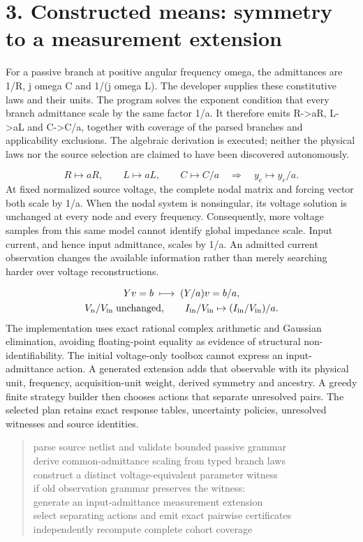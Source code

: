 \documentclass[10pt,letterpaper]{article}
\begin{document}
\section*{\color{accent}3. Constructed means: symmetry to a measurement extension}
For a passive branch at positive angular frequency omega, the admittances are 1/R, j omega C and 1/(j omega L). The developer supplies these constitutive laws and their units. The program solves the exponent condition that every branch admittance scale by the same factor 1/a. It therefore emits R->aR, L->aL and C->C/a, together with coverage of the parsed branches and applicability exclusions. The algebraic derivation is executed; neither the physical laws nor the source selection are claimed to have been discovered autonomously.\par
\[ R\mapsto aR,\qquad L\mapsto aL,\qquad C\mapsto C/a\quad\Longrightarrow\quad y_e\mapsto y_e/a. \]
At fixed normalized source voltage, the complete nodal matrix and forcing vector both scale by 1/a. When the nodal system is nonsingular, its voltage solution is unchanged at every node and every frequency. Consequently, more voltage samples from this same model cannot identify global impedance scale. Input current, and hence input admittance, scales by 1/a. An admitted current observation changes the available information rather than merely searching harder over voltage reconstructions.\par
\[ \begin{gathered}Yv=b\;\longmapsto\;(Y/a)v=b/a,\\ V_n/V_{\rm in}\;\text{unchanged},\qquad I_{\rm in}/V_{\rm in}\mapsto(I_{\rm in}/V_{\rm in})/a.\end{gathered} \]
The implementation uses exact rational complex arithmetic and Gaussian elimination, avoiding floating-point equality as evidence of structural non-identifiability. The initial voltage-only toolbox cannot express an input-admittance action. A generated extension adds that observable with its physical unit, frequency, acquisition-unit weight, derived symmetry and ancestry. A greedy finite strategy builder then chooses actions that separate unresolved pairs. The selected plan retains exact response tables, uncertainty policies, unresolved witnesses and source identities.\par
\begin{quote}\footnotesize\ttfamily\raggedright parse source netlist and validate bounded passive grammar\\derive common-admittance scaling from typed branch laws\\construct a distinct voltage-equivalent parameter witness\\if old observation grammar preserves the witness:\\    generate an input-admittance measurement extension\\select separating actions and emit exact pairwise certificates\\independently recompute complete cohort coverage\end{quote}
\end{document}
